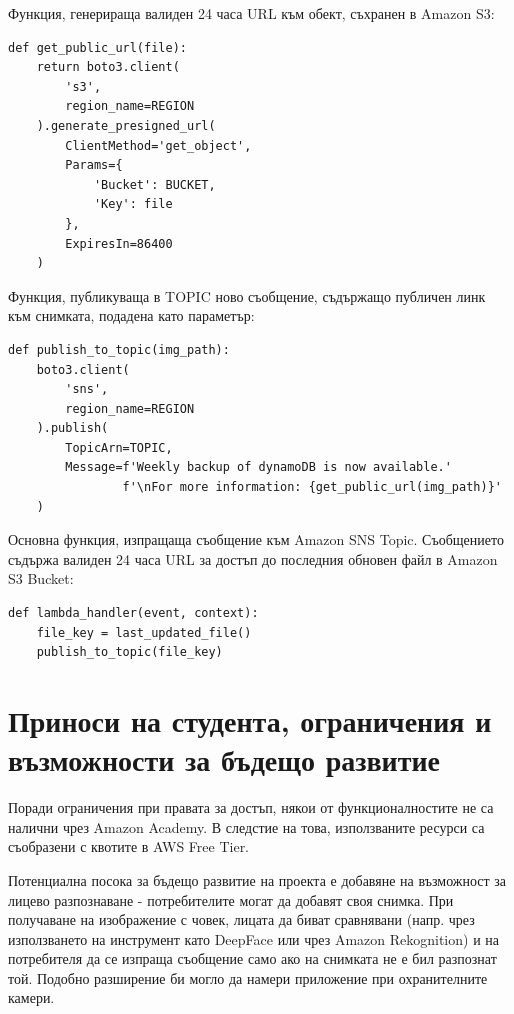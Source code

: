 \documentclass[12pt]{article}
\begin{document}
Функция, генерираща валиден 24 часа URL към обект, съхранен в Amazon S3:
\begin{verbatim}
def get_public_url(file):
    return boto3.client(
        's3',
        region_name=REGION
    ).generate_presigned_url(
        ClientMethod='get_object',
        Params={
            'Bucket': BUCKET,
            'Key': file
        },
        ExpiresIn=86400
    )
\end{verbatim}

Функция, публикуваща в TOPIC ново съобщение, съдържащо публичен линк към снимката, подадена като параметър: 
\begin{verbatim}
def publish_to_topic(img_path):
    boto3.client(
        'sns',
        region_name=REGION
    ).publish(
        TopicArn=TOPIC,
        Message=f'Weekly backup of dynamoDB is now available.'
                f'\nFor more information: {get_public_url(img_path)}'
    )
\end{verbatim}

Основна функция, изпращаща съобщение към Amazon SNS Topic. Съобщението съдържа валиден 24 часа URL за достъп до последния обновен файл в Amazon S3 Bucket:
\begin{verbatim}
def lambda_handler(event, context):
    file_key = last_updated_file()
    publish_to_topic(file_key)
\end{verbatim}

\medskip

\clearpage
\pagebreak

\section{Приноси на студента, ограничения и възможности за бъдещо развитие}

\hspace{\parindent}Поради ограничения при правата за достъп, някои от функционалностите не са налични чрез Amazon Academy. В следстие на това, използваните ресурси са съобразени с квотите в AWS Free Tier.

Потенциална посока за бъдещо развитие на проекта е добавяне на възможност за лицево разпознаване - потребителите могат да добавят своя снимка. При получаване на изображение с човек, лицата да биват сравнявани (напр. чрез използването на инструмент като DeepFace или чрез Amazon Rekognition) и на потребителя да се изпраща съобщение само ако на снимката не е бил разпознат той. Подобно разширение би могло да намери приложение при охранителните камери.
\end{document}

